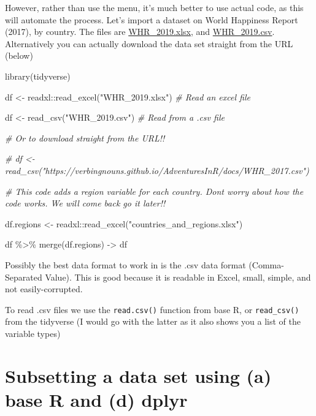 \documentclass[]{article}
\newenvironment{Shaded}{\begin{snugshade}}{\end{snugshade}}
\newcommand{\CommentTok}[1]{\textcolor[rgb]{0.56,0.35,0.01}{\textit{#1}}}
\newcommand{\FunctionTok}[1]{\textcolor[rgb]{0.00,0.00,0.00}{#1}}
\newcommand{\NormalTok}[1]{#1}
\newcommand{\OtherTok}[1]{\textcolor[rgb]{0.56,0.35,0.01}{#1}}
\newcommand{\SpecialCharTok}[1]{\textcolor[rgb]{0.00,0.00,0.00}{#1}}
\newcommand{\StringTok}[1]{\textcolor[rgb]{0.31,0.60,0.02}{#1}}
\begin{document}
However, rather than use the menu, it's much better to use actual code,
as this will automate the process. Let's import a dataset on World
Happiness Report (2017), by country. The files are \url{WHR_2019.xlsx},
and \url{WHR_2019.csv}. Alternatively you can actually download the data
set straight from the URL (below)

\begin{Shaded}
\begin{Highlighting}[]
\FunctionTok{library}\NormalTok{(tidyverse)}

\NormalTok{df }\OtherTok{\textless{}{-}}\NormalTok{ readxl}\SpecialCharTok{::}\FunctionTok{read\_excel}\NormalTok{(}\StringTok{"WHR\_2019.xlsx"}\NormalTok{) }\CommentTok{\# Read an excel file}

\NormalTok{df }\OtherTok{\textless{}{-}} \FunctionTok{read\_csv}\NormalTok{(}\StringTok{"WHR\_2019.csv"}\NormalTok{) }\CommentTok{\# Read from a .csv file}

\CommentTok{\# Or to download straight from the URL!!}

\CommentTok{\# df \textless{}{-} read\_csv("https://verbingnouns.github.io/AdventuresInR/docs/WHR\_2017.csv")}

\CommentTok{\# This code adds a region variable for each country. Don\textquotesingle{}t worry about how the code works. We will come back go it later!!}

\NormalTok{df.regions }\OtherTok{\textless{}{-}}\NormalTok{ readxl}\SpecialCharTok{::}\FunctionTok{read\_excel}\NormalTok{(}\StringTok{"countries\_and\_regions.xlsx"}\NormalTok{)}

\NormalTok{df }\SpecialCharTok{\%\textgreater{}\%} \FunctionTok{merge}\NormalTok{(df.regions) }\OtherTok{{-}\textgreater{}}\NormalTok{ df}
\end{Highlighting}
\end{Shaded}

Possibly the best data format to work in is the .csv data format
(Comma-Separated Value). This is good because it is readable in Excel,
small, simple, and not easily-corrupted.

To read .csv files we use the \texttt{read.csv()} function from base R,
or \texttt{read\_csv()} from the tidyverse (I would go with the latter
as it also shows you a list of the variable types)

\hypertarget{subsetting-a-data-set-using-a-base-r-and-d-dplyr}{%
\section{Subsetting a data set using (a) base R and (d)
dplyr}\label{subsetting-a-data-set-using-a-base-r-and-d-dplyr}}
\end{document}
